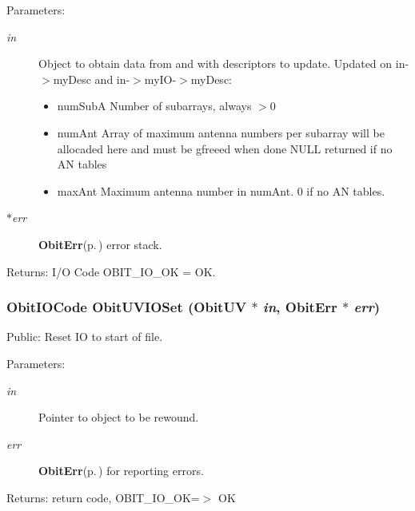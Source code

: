 \begin{Desc}
\item[Parameters:]
\begin{description}
\item[{\em in}]Object to obtain data from and with descriptors to update. Updated on in-$>$my\-Desc and in-$>$my\-IO-$>$my\-Desc: \begin{itemize}
\item num\-Sub\-A Number of subarrays, always $>$0 \item num\-Ant Array of maximum antenna numbers per subarray will be allocaded here and must be gfreeed when done NULL returned if no AN tables \item max\-Ant Maximum antenna number in num\-Ant. 0 if no AN tables. \end{itemize}
\item[{\em $\ast$err}]{\bf Obit\-Err}{\rm (p.\,\pageref{structObitErr})} error stack. \end{description}
\end{Desc}
\begin{Desc}
\item[Returns:]I/O Code OBIT\_\-IO\_\-OK = OK. \end{Desc}
\subsubsection{\setlength{\rightskip}{0pt plus 5cm}Obit\-IOCode Obit\-UVIOSet ({\bf Obit\-UV} $\ast$ {\em in}, {\bf Obit\-Err} $\ast$ {\em err})}\label{ObitUV_8h_a36}


Public: Reset IO to start of file. 

\begin{Desc}
\item[Parameters:]
\begin{description}
\item[{\em in}]Pointer to object to be rewound. \item[{\em err}]{\bf Obit\-Err}{\rm (p.\,\pageref{structObitErr})} for reporting errors. \end{description}
\end{Desc}
\begin{Desc}
\item[Returns:]return code, OBIT\_\-IO\_\-OK=$>$ OK \end{Desc}
